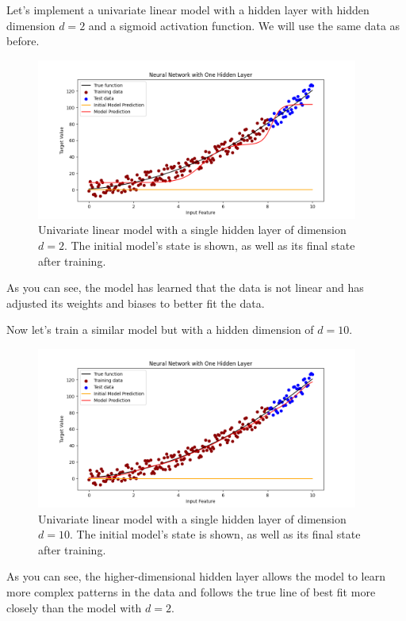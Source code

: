 Let's implement a univariate linear model with a hidden layer with hidden dimension $d=2$ and a sigmoid activation function. We will use the same data as before.



\begin{figure}[H]
\centering
\includegraphics[width=300pt]{Regression/code/neural-network1.png}
\caption{Univariate linear model with a single hidden layer of dimension $d=2$. The initial model's state is shown, as well as its final state after training.}
\label{fig:linear10}
\end{figure}

As you can see, the model has learned that the data is not linear and has adjusted its weights and biases to better fit the data. 

Now let's train a similar model but with a hidden dimension of $d=10$.



\begin{figure}[H]
\centering
\includegraphics[width=300pt]{Regression/code/neural-network2.png}
\caption{Univariate linear model with a single hidden layer of dimension $d=10$. The initial model's state is shown, as well as its final state after training.}
\label{fig:linear11}
\end{figure}

As you can see, the higher-dimensional hidden layer allows the model to learn more complex patterns in the data and follows the true line of best fit more closely than the model with $d=2$.

